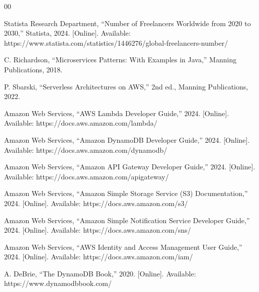 \documentclass[conference]{IEEEtran}
\begin{document}
\begin{thebibliography}{00}

 Statista Research Department, ``Number of Freelancers Worldwide from 2020 to 2030,'' Statista, 2024. [Online]. Available: https://www.statista.com/statistics/1446276/global-freelancers-number/

 C. Richardson, ``Microservices Patterns: With Examples in Java,'' Manning Publications, 2018.

 P. Sbarski, ``Serverless Architectures on AWS,'' 2nd ed., Manning Publications, 2022.

 Amazon Web Services, ``AWS Lambda Developer Guide,'' 2024. [Online]. Available: https://docs.aws.amazon.com/lambda/

 Amazon Web Services, ``Amazon DynamoDB Developer Guide,'' 2024. [Online]. Available: https://docs.aws.amazon.com/dynamodb/

 Amazon Web Services, ``Amazon API Gateway Developer Guide,'' 2024. [Online]. Available: https://docs.aws.amazon.com/apigateway/

 Amazon Web Services, ``Amazon Simple Storage Service (S3) Documentation,'' 2024. [Online]. Available: https://docs.aws.amazon.com/s3/

 Amazon Web Services, ``Amazon Simple Notification Service Developer Guide,'' 2024. [Online]. Available: https://docs.aws.amazon.com/sns/

 Amazon Web Services, ``AWS Identity and Access Management User Guide,'' 2024. [Online]. Available: https://docs.aws.amazon.com/iam/

 A. DeBrie, ``The DynamoDB Book,'' 2020. [Online]. Available: https://www.dynamodbbook.com/

\end{thebibliography}
\end{document}
